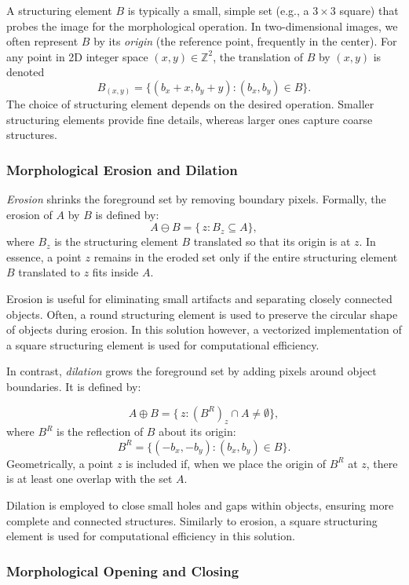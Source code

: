 \documentclass[a4paper,12pt]{article}
\begin{document}
A structuring element \(B\) is typically a small, simple set (e.g., a \(3 \times 3\) square) that probes the image for the morphological operation. In two-dimensional images, we often represent \(B\) by its \emph{origin} (the reference point, frequently in the center). For any point in 2D integer space \((x, y) \in \mathbb{Z}^2\), the translation of \(B\) by \((x, y)\) is denoted
\[
  B_{(x,y)} = \{(b_x + x, b_y + y) : (b_x, b_y) \in B \}.
\]
The choice of structuring element depends on the desired operation. Smaller structuring elements provide fine details, whereas larger ones capture coarse structures.

\subsubsection{Morphological Erosion and Dilation}

\emph{Erosion} shrinks the foreground set by removing boundary pixels. Formally, the erosion of \(A\) by \(B\) is defined by:
\[
  A \ominus B = \{\,z : B_{z} \subseteq A \},
\]
where \(B_z\) is the structuring element \(B\) translated so that its origin is at \(z\). In essence, a point \(z\) remains in the eroded set only if the entire structuring element \(B\) translated to \(z\) fits inside \(A\).

Erosion is useful for eliminating small artifacts and separating closely connected objects. Often, a round structuring element is used to preserve the circular shape of objects during erosion. In this solution however, a vectorized implementation of a square structuring element is used for computational efficiency.

In contrast, \emph{dilation} grows the foreground set by adding pixels around object boundaries. It is defined by:

\[
  A \oplus B = \{\,z : (B^R)_{z} \cap A \neq \emptyset \},
\]
where \(B^R\) is the reflection of \(B\) about its origin:
\[
  B^R = \{(-b_x, -b_y) : (b_x, b_y) \in B \}.
\]
Geometrically, a point \(z\) is included if, when we place the origin of \(B^R\) at \(z\), there is at least one overlap with the set \(A\).

Dilation is employed to close small holes and gaps within objects, ensuring more complete and connected structures. Similarly to erosion, a square structuring element is used for computational efficiency in this solution.

\subsubsection{Morphological Opening and Closing}
\end{document}
